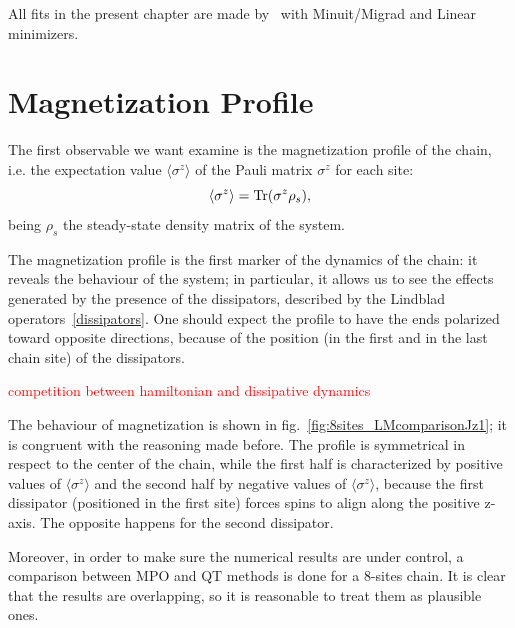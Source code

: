 All fits in the present chapter are made by~\cite{root_cern} with Minuit/Migrad and Linear minimizers.

\section{Magnetization Profile}
\label{sec:magn_profile}
The first observable we want examine is the magnetization profile of the chain, i.e. the expectation value $\langle \sigma^z \rangle$ of the Pauli matrix $\sigma^z$ for each site:
\begin{equation*}
    \langle \sigma^z \rangle = \operatorname{Tr}(\sigma^z \rho_s),
\end{equation*}
being $\rho_s$ the steady-state density matrix of the system.

The magnetization profile is the first marker of the dynamics of the chain: it reveals the behaviour of the system; in particular, it allows us to see the effects generated by the presence of the dissipators, described by the Lindblad operators~\ref{dissipators}. One should expect the profile to have the ends polarized toward opposite directions, because of the position (in the first and in the last chain site) of the dissipators.

\textcolor{red}{competition between hamiltonian and dissipative dynamics}

The behaviour of magnetization is shown in fig.~\ref{fig:8sites_LMcomparisonJz1}; it is congruent with the reasoning made before. The profile is symmetrical in respect to the center of the chain, while the first half is characterized by positive values of  $\langle \sigma^z \rangle$ and the second half by negative values of $\langle \sigma^z \rangle$, because the first dissipator (positioned in the first site) forces spins to align along the positive z-axis. The opposite happens for the second dissipator.

Moreover, in order to make sure the numerical results are under control, a comparison between MPO and QT methods is done for a 8-sites chain. It is clear that the results are overlapping, so it is reasonable to treat them as plausible ones.

